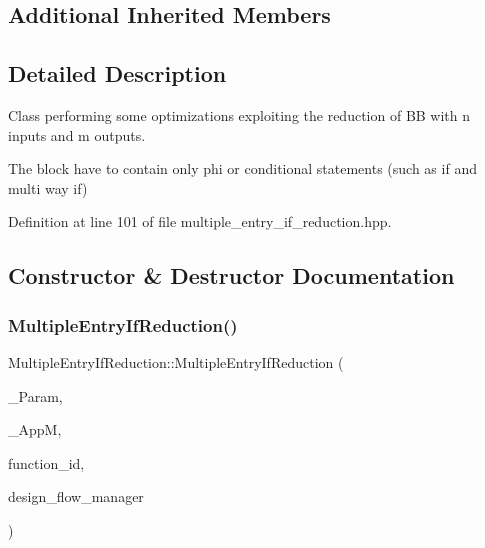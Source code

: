 \subsection*{Additional Inherited Members}


\subsection{Detailed Description}
Class performing some optimizations exploiting the reduction of BB with n inputs and m outputs. 

The block have to contain only phi or conditional statements (such as if and multi way if) 

Definition at line 101 of file multiple\+\_\+entry\+\_\+if\+\_\+reduction.\+hpp.



\subsection{Constructor \& Destructor Documentation}
\mbox{\label{classMultipleEntryIfReduction_a6e3f904467d49c19ab6b7a77bef40453}} 
\subsubsection{\texorpdfstring{Multiple\+Entry\+If\+Reduction()}{MultipleEntryIfReduction()}}
{\footnotesize\ttfamily Multiple\+Entry\+If\+Reduction\+::\+Multiple\+Entry\+If\+Reduction (\begin{DoxyParamCaption}\item[{const \hyperlink{Parameter_8hpp_a37841774a6fcb479b597fdf8955eb4ea}{Parameter\+Const\+Ref}}]{\+\_\+\+Param,  }\item[{const \hyperlink{application__manager_8hpp_a04ccad4e5ee401e8934306672082c180}{application\+\_\+manager\+Ref}}]{\+\_\+\+AppM,  }\item[{unsigned int}]{function\+\_\+id,  }\item[{const Design\+Flow\+Manager\+Const\+Ref}]{design\+\_\+flow\+\_\+manager }\end{DoxyParamCaption})}



